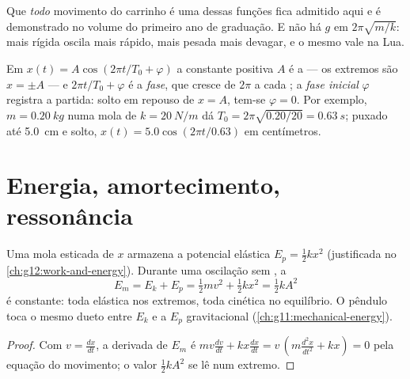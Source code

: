 \begin{remark}\label{rem:g12:oscillators-and-time:uniqueness}
Que \emph{todo} movimento do carrinho é uma dessas funções fica admitido aqui e é
demonstrado no volume do primeiro ano de graduação. E não há $g$ em $2\pi\sqrt{m/k}$:
mais rígida oscila mais rápido, mais pesada mais devagar, e o mesmo vale na Lua.
\end{remark}

\begin{definition}\label{def:g12:oscillators-and-time:phase}
Em $x(t) = A\cos(2\pi t/T_0 + \varphi)$ a constante positiva $A$ é a  --- os
extremos são $x = \pm A$ --- e $2\pi t/T_0 + \varphi$ é a \emph{fase}, que
cresce de $2\pi$ a cada ; a \emph{fase inicial} $\varphi$
registra a partida: solto em repouso de $x = A$, tem-se $\varphi = 0$. Por exemplo,
$m = \qty{0.20}{kg}$ numa mola de $k = \qty{20}{N/m}$ dá
$T_0 = 2\pi\sqrt{0.20/20} = \qty{0.63}{s}$; puxado até \qty{5.0}{cm} e solto,
$x(t) = 5.0\cos(2\pi t/0.63)$ em centímetros.
\end{definition}

\section{Energia, amortecimento, ressonância}

\begin{proposition}\label{prop:g12:oscillators-and-time:energy}
Uma mola esticada de $x$ armazena a  potencial elástica $E_p = \tfrac12 kx^2$
(justificada no \cref{ch:g12:work-and-energy}). Durante uma oscilação sem , a
\[
E_m = E_k + E_p = \tfrac12 m v^2 + \tfrac12 k x^2 = \tfrac12 k A^2
\]
é constante: toda elástica nos extremos, toda cinética no equilíbrio. O pêndulo toca o
mesmo dueto entre $E_k$ e a $E_p$ gravitacional (\cref{ch:g11:mechanical-energy}).
\end{proposition}

\begin{proof}
Com $v = \frac{dx}{dt}$, a derivada de $E_m$ é
$mv\frac{dv}{dt} + kx\frac{dx}{dt} = v\,(m\frac{d^2x}{dt^2} + kx) = 0$ pela equação do
movimento; o valor $\tfrac12 kA^2$ se lê num extremo.
\end{proof}

